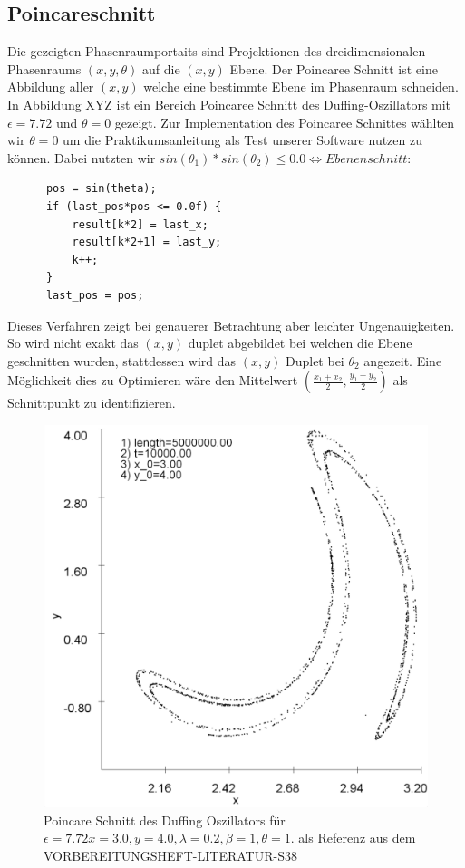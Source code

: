 \documentclass{scrartcl}
\begin{document}
\subsection{ Poincareschnitt }
Die gezeigten Phasenraumportaits sind Projektionen des dreidimensionalen Phasenraums $(x,y,\theta)$ auf die $(x,y)$ Ebene. Der Poincaree Schnitt ist eine Abbildung aller $(x,y)$ welche eine bestimmte Ebene im Phasenraum schneiden. In Abbildung XYZ ist ein Bereich Poincaree Schnitt des Duffing-Oszillators mit $\epsilon=7.72$ und $\theta=0$ gezeigt. Zur Implementation des Poincaree Schnittes wählten wir $\theta=0$ um die Praktikumsanleitung als Test unserer Software nutzen zu können. Dabei nutzten wir $sin(\theta_1)*sin(\theta_2) \leq 0.0 \iff Ebenenschnitt$:
\begin{lstlisting}
      pos = sin(theta);
      if (last_pos*pos <= 0.0f) {
          result[k*2] = last_x;
          result[k*2+1] = last_y;
          k++;
      }
      last_pos = pos;

\end{lstlisting}
Dieses Verfahren zeigt bei genauerer Betrachtung aber leichter Ungenauigkeiten. So wird nicht exakt das $(x,y)$ duplet abgebildet bei welchen die Ebene geschnitten wurden, stattdessen wird das $(x,y)$ Duplet bei $\theta_2$ angezeit. Eine Möglichkeit dies zu Optimieren wäre den Mittelwert $(\frac{x_1+x_2}{2}, \frac{y_1 + y_2}{2})$ als Schnittpunkt zu identifizieren.
\begin{figure}
	\centering
	\includegraphics[scale=0.20]{poincare-772}
	\caption{Poincare Schnitt des Duffing Oszillators für $\epsilon=7.72 x=3.0, y=4.0, \lambda=0.2, \beta=1, \theta=1$. als Referenz aus dem VORBEREITUNGSHEFT-LITERATUR-S38}
	\label{img:poincare-772}
\end{figure}
\end{document}
